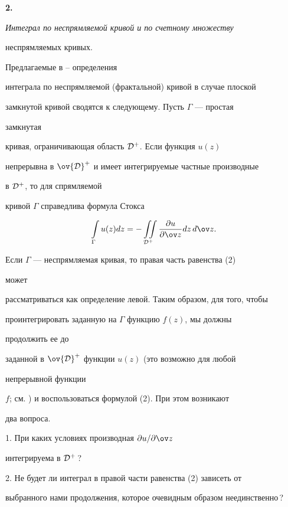 {\bf 2.} {\it Интеграл по неспрямляемой кривой и по счетному множеству


неспрямляемых кривых.} Предлагаемые в \cite{7}--\cite{10} определения


интеграла по неспрямляемой (фрактальной) кривой в случае плоской


замкнутой кривой сводятся к следующему. Пусть $\Gamma$ --- простая


замкнутая


кривая, ограничивающая область $\cal D^+$. Если функция $u(z)$


непрерывна в $\ov{\cal D}^+$ и имеет интегрируемые частные производные


в $\cal D^+$, то для спрямляемой


кривой $\Gamma$ справедлива формула Стокса


\begin{equation}


\int\limits_\Gamma u(z)dz=-\iint\limits_{\cal D^+}


\frac{\partial u}{\partial \ov z}dz\,d\ov z.


\end{equation}


Если $\Gamma$ --- неспрямляемая кривая, то правая часть равенства (2)


может


рассматриваться как определение левой. Таким образом, для того, чтобы


проинтегрировать заданную на $\Gamma$ функцию $f(z)$, мы должны


продолжить ее до


заданной в $\ov{\cal D}^+$ функции $u(z)$ (это возможно для любой


непрерывной функции


$f$; см. \cite{12}) и воспользоваться формулой (2). При этом возникают


два вопроса.





1. При каких условиях производная $\partial u/\partial \ov z$


интегрируема в $\cal D^+$\,?





2. Не будет ли интеграл в правой части равенства (2) зависеть от


выбранного нами продолжения, которое очевидным образом неединственно\,?





